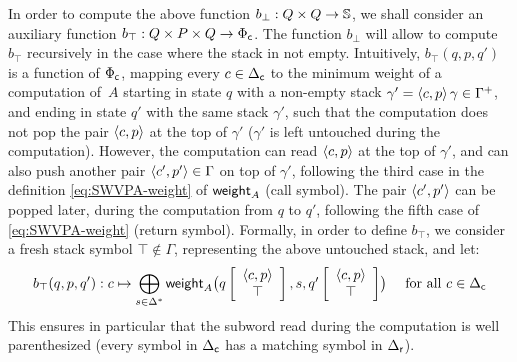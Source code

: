 \noindent
In order to compute the above function $b_\bot : Q \times Q \to \mathbb{S}$,
we shall consider an auxiliary function $b_\top :  Q \times P \times Q \to {\Phi_\mathsf{c}}$.
The function $b_\bot$ will allow to compute $b_\top$ recursively in the case where the stack in not empty.
%
Intuitively, $b_\top(q, p, q')$ is a function of ${\Phi_\mathsf{c}}$,
mapping every $c \in {\Delta_\mathsf{c}}$ to
the minimum weight of a computation of~$A$
starting in state $q$ with a non-empty stack
$\gamma' = \<c, p> \, \gamma \in \Gamma^+$,
and ending in state $q'$ with the same stack $\gamma'$,
such that
the computation does not pop the pair $\<c, p>$ at the top of $\gamma'$
(\ie $\gamma'$ is left untouched during the computation).
However, the computation can read $\<c, p>$ at the top of $\gamma'$,
and can also push another pair $\< c', p'> \in \Gamma$ on top of $\gamma'$,
following the third case 
in the definition \eqref{eq:SWVPA-weight} of $\mathsf{weight}_A$ (call symbol).
The pair $\< c', p'>$ can be popped later, during the computation from $q$ to $q'$,
following the fifth case of \eqref{eq:SWVPA-weight} (return symbol).
%
%
Formally, in order to define $b_\top$, we consider
a fresh stack symbol $\top \notin \Gamma$,   %
representing the above untouched stack, and let:
%
\begin{equation}\label{eq:btop}
  b_\top(q, p, q') : c \mapsto \bigoplus_{s\in \Delta^*}
  \textstyle
  \weight_A\bigl(\configup{q}{\< c, p> \stackup \top }, s, \configup{q'}{\<c, p> \stackup \top}\bigr)
\quad
\mathrm{~for~all~} c \in \Deltac
\end{equation}
%
%
This ensures in particular that the subword
read during the computation is well parenthesized
(every symbol in ${\Delta_\mathsf{c}}$ has a matching symbol in ${\Delta_\mathsf{r}}$).

